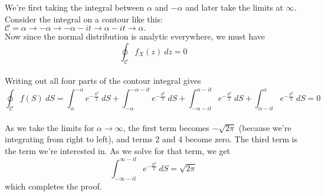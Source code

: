 \documentclass[paper=a4, fontsize=11pt]{scrartcl} %
\numberwithin{equation}{section} %
\numberwithin{figure}{section} %
\numberwithin{table}{section} %
\begin{document}
We're first taking the integral between $\alpha$ and $-\alpha$ and later take the limits at $\infty$.
Consider the integral on a contour like this: $\mathcal{C} = \alpha \rightarrow -\alpha \rightarrow -\alpha-it \rightarrow \alpha-it \rightarrow \alpha.$ \\
Now since the normal distribution is analytic everywhere, we must have
\begin{equation}
	\oint_\mathcal{C}{f_X(z)\ dz} = 0
\end{equation}
\\
Writing out all four parts of the contour integral gives
\begin{equation}
	\oint_\mathcal{C}{f(S)\ dS} = \int_{\alpha}^{-\alpha}{e^{-\frac{S^2}{2}}\ dS} + \int_{-\alpha}^{-\alpha-it}{e^{-\frac{S^2}{2}}\ dS} + \int_{-\alpha-it}^{\alpha-it}{e^{-\frac{S^2}{2}}\ dS} + \int_{\alpha-it}^{\alpha}{e^{-\frac{S^2}{2}}\ dS} = 0
\end{equation}
\\
As we take the limits for $\alpha \rightarrow \infty$, the first term becomes $-\sqrt{2\pi}$ (because we're integrating from right to left), and terms 2 and 4 become zero. The third term is the term we're interested in. As we solve for that term, we get
\begin{equation}
	\int_{-\infty-it}^{\infty-it}{e^{-\frac{S^2}{2}}\ dS} = \sqrt{2\pi}
\end{equation}
which completes the proof.
\end{document}
